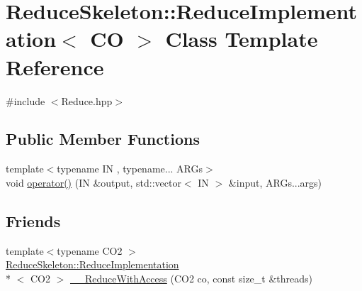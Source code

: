 \hypertarget{classReduceSkeleton_1_1ReduceImplementation}{\section{Reduce\-Skeleton\-:\-:Reduce\-Implementation$<$ C\-O $>$ Class Template Reference}
\label{classReduceSkeleton_1_1ReduceImplementation}
}


{\ttfamily \#include $<$Reduce.\-hpp$>$}

\subsection*{Public Member Functions}
\begin{DoxyCompactItemize}
\item 
{\footnotesize template$<$typename I\-N , typename... A\-R\-Gs$>$ }\\void \hyperlink{classReduceSkeleton_1_1ReduceImplementation_a47458d1b1d6bf24c2e1ca6797c27bbc5}{operator()} (I\-N \&output, std\-::vector$<$ I\-N $>$ \&input, A\-R\-Gs...\-args)
\end{DoxyCompactItemize}
\subsection*{Friends}
\begin{DoxyCompactItemize}
\item 
{\footnotesize template$<$typename C\-O2 $>$ }\\\hyperlink{classReduceSkeleton_1_1ReduceImplementation}{Reduce\-Skeleton\-::\-Reduce\-Implementation}\\*
$<$ C\-O2 $>$ \hyperlink{classReduceSkeleton_1_1ReduceImplementation_afa20d0c393a3a0891c2b49f7cf96eaca}{\-\_\-\-\_\-\-Reduce\-With\-Access} (C\-O2 co, const size\-\_\-t \&threads)
\end{DoxyCompactItemize}


